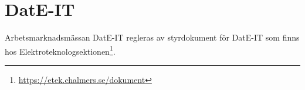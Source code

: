 \section{DatE-IT}
Arbetsmarknadsmässan DatE-IT regleras av styrdokument för DatE-IT som finns
hos Elektroteknologsektionen\footnote{\url{https://etek.chalmers.se/dokument}}. 

